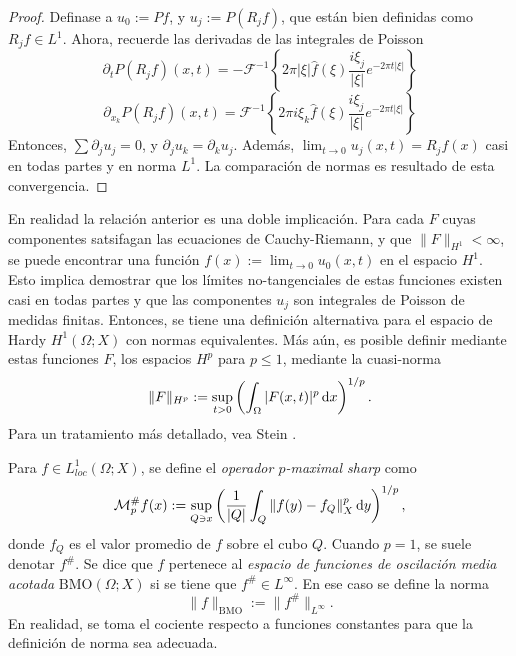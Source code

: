 \begin{proof}
	 Definase a $u_0 := Pf$, y $u_j := P(R_jf)$, que están bien definidas como $R_jf\in L^1$. Ahora, recuerde las derivadas de las integrales de Poisson
			\begin{equation*}
		\partial_t P(R_jf)(x, t) = -  \mathcal{F}^{-1}\left\{2\pi|\xi| \widehat{f}(\xi) \frac{i\xi_j}{|\xi|}e^{-2\pi t |\xi|} \right\}
	\end{equation*}
	\begin{equation*}
		\partial_{x_k} P(R_jf)(x, t) = \mathcal{F}^{-1}\left\{2\pi i\xi_k\widehat{f}(\xi) \frac{i\xi_j}{|\xi|}e^{-2\pi t |\xi|} \right\}
	\end{equation*}
	Entonces, $\sum \partial_j u_j = 0$, y $\partial_j u_k = \partial_k u_j$. Además, $\lim_{t\to0}u_j(x, t) = R_jf(x)$ casi en todas partes y en norma $L^1$. La comparación de normas es resultado de esta convergencia.
\end{proof}
\begin{remark}
	En realidad la relación anterior es una doble implicación. Para cada $F$ cuyas componentes satsifagan las ecuaciones de Cauchy-Riemann, y que $\|F\|_{H^1}<\infty$, se puede encontrar una función $f(x):= \lim_{t\to0}u_0(x, t)$ en el espacio $H^1$. Esto implica demostrar que los límites no-tangenciales de estas funciones existen casi en todas partes y que las componentes $u_j$ son integrales de Poisson de medidas finitas. Entonces, se tiene una definición alternativa para el espacio de Hardy $H^1(\Omega;X)$ con normas equivalentes. Más aún, es posible definir mediante estas funciones $F$, los espacios $H^p$ para $p\leq1$, mediante la cuasi-norma
	\begin{equation*}
		\|F\|_{H^p} := \sup_{t>0} \left(\int_{\Omega} |F(x, t)|^p \mathop{}\!\mathrm{d} x\right)^{1/p}.
	\end{equation*}
	Para un tratamiento más detallado, vea Stein \cite{stein-singular}.
\end{remark}
\begin{definition}
	Para $f\in L^1_{loc}(\Omega; X)$, se define el \textit{operador $p$-maximal sharp} como
	\begin{equation*}
		\mathcal{M}_p^\#f(x) := \sup_{Q\ni x} \left( \frac{1}{|Q|}\int_Q \|f(y)-f_Q\|_X^p \mathop{}\!\mathrm{d} y\right)^{1/p},
	\end{equation*}
	donde $f_Q$ es el valor promedio de $f$ sobre el cubo $Q$. Cuando $p=1$, se suele denotar $f^\#$. Se dice que $f$ pertenece al \textit{espacio de funciones de oscilación media acotada} $\mathrm{BMO}(\Omega; X)$ si se tiene que $f^\# \in{L^\infty}$. En ese caso se define la norma
	\begin{equation*}
		\|f\|_{\mathrm{BMO}} := \| f^\#\|_{L^\infty}.
	\end{equation*}
	En realidad, se toma el cociente respecto a funciones constantes para que la definición de norma sea adecuada.
\end{definition}
